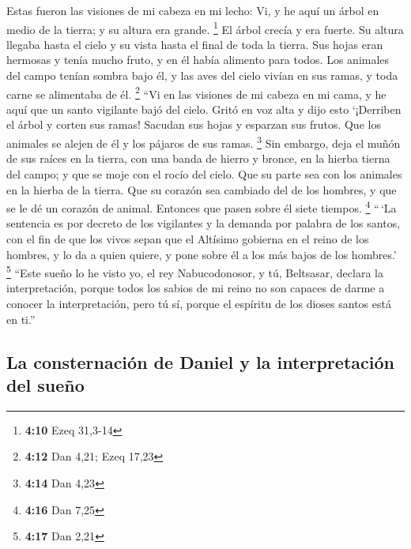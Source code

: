 \begin{paracol}{2}
 Estas fueron las visiones de mi cabeza en mi lecho: Vi,
y he aquí un árbol en medio de la tierra; y su altura era grande.
\footnote{\textbf{4:10} Ezeq 31,3-14}  El árbol crecía y
era fuerte. Su altura llegaba hasta el cielo y su vista hasta el final
de toda la tierra.  Sus hojas eran hermosas y tenía mucho
fruto, y en él había alimento para todos. Los animales del campo tenían
sombra bajo él, y las aves del cielo vivían en sus ramas, y toda carne
se alimentaba de él. \footnote{\textbf{4:12} Dan 4,21; Ezeq 17,23}
 ``Vi en las visiones de mi cabeza en mi cama, y he aquí
que un santo vigilante bajó del cielo.  Gritó en voz alta
y dijo esto `¡Derriben el árbol y corten sus ramas! Sacudan sus hojas y
esparzan sus frutos. Que los animales se alejen de él y los pájaros de
sus ramas. \footnote{\textbf{4:14} Dan 4,23}  Sin
embargo, deja el muñón de sus raíces en la tierra, con una banda de
hierro y bronce, en la hierba tierna del campo; y que se moje con el
rocío del cielo. Que su parte sea con los animales en la hierba de la
tierra.  Que su corazón sea cambiado del de los hombres,
y que se le dé un corazón de animal. Entonces que pasen sobre él siete
tiempos. \footnote{\textbf{4:16} Dan 7,25}  ``\,`La
sentencia es por decreto de los vigilantes y la demanda por palabra de
los santos, con el fin de que los vivos sepan que el Altísimo gobierna
en el reino de los hombres, y lo da a quien quiere, y pone sobre él a
los más bajos de los hombres.' \footnote{\textbf{4:17} Dan 2,21}
 ``Este sueño lo he visto yo, el rey Nabucodonosor, y tú,
Beltsasar, declara la interpretación, porque todos los sabios de mi
reino no son capaces de darme a conocer la interpretación, pero tú sí,
porque el espíritu de los dioses santos está en ti.''

\hypertarget{la-consternaciuxf3n-de-daniel-y-la-interpretaciuxf3n-del-sueuxf1o}{%
\subsection{La consternación de Daniel y la interpretación del
sueño}\label{la-consternaciuxf3n-de-daniel-y-la-interpretaciuxf3n-del-sueuxf1o}}


\end{paracol}
